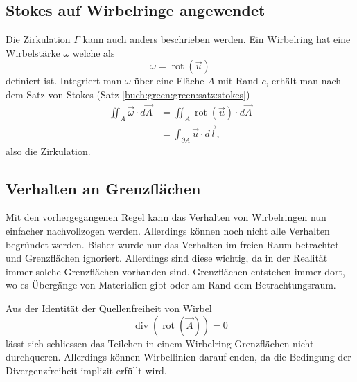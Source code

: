 \subsection{Stokes auf Wirbelringe angewendet \label{paper:Wirbelringe:Stokes}}

Die Zirkulation \(\Gamma\) kann auch anders beschrieben werden. 
Ein Wirbelring hat eine Wirbelstärke \(\omega\) welche als
\[
\omega
=
\operatorname{rot}\left( \vec{u} \right)
\]
definiert ist.
Integriert man $\omega$ über eine Fläche \(A\) mit Rand \(c\), erhält man nach dem Satz von Stokes (Satz \ref{buch:green:green:satz:stokes})
\begin{align*}
\iint_{A} \vec{\omega} \cdot d \vec{A}
&=
\iint_{A} \operatorname{rot}\left(\vec{u}\right)\cdot  d \vec{A}\\
&=
\int_{\partial A} \vec{u} \cdot d\vec{l},
\end{align*}
also die Zirkulation.

\subsection{Verhalten an Grenzflächen \label{paper:Wirbelringe:Grenzflaechen}}

Mit den vorhergegangenen Regel kann das Verhalten von Wirbelringen nun einfacher nachvollzogen werden. 
Allerdings können noch nicht alle Verhalten begründet werden. 
Bisher wurde nur das Verhalten im freien Raum betrachtet und Grenzflächen ignoriert. 
Allerdings sind diese wichtig, da in der Realität immer solche Grenzflächen vorhanden sind. 
Grenzflächen entstehen immer dort, wo es Übergänge von Materialien gibt oder am Rand dem Betrachtungsraum.

Aus der Identität der Quellenfreiheit von Wirbel 
\[
\operatorname{div} \left( \operatorname{rot} \left( \vec{A} \right) \right) 
= 
0
\]
lässt sich schliessen das Teilchen in einem Wirbelring Grenzflächen nicht durchqueren. 
Allerdings können Wirbellinien darauf enden, da die Bedingung der Divergenzfreiheit implizit erfüllt wird. 
